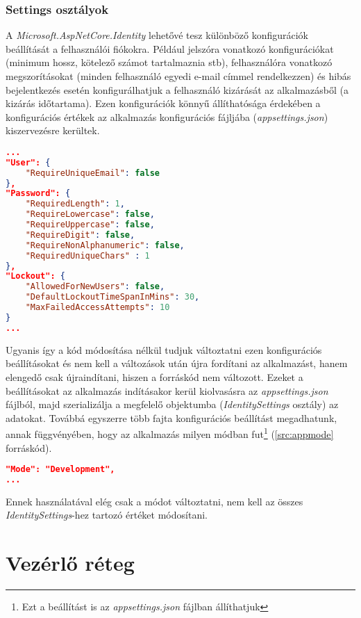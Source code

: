 \subsubsection{Settings osztályok}
A \emph{Microsoft.AspNetCore.Identity} \cite{IdentityOptions} lehetővé tesz különböző konfigurációk beállítását a felhasználói fiókokra. Például jelszóra vonatkozó konfigurációkat (minimum hossz, kötelező számot tartalmaznia stb), felhasználóra vonatkozó megszorításokat (minden felhasználó egyedi e-mail címmel rendelkezzen) és hibás bejelentkezés esetén konfigurálhatjuk a felhasználó kizárását az alkalmazásből (a kizárás időtartama). Ezen konfigurációk könnyű állíthatósága érdekében a konfigurációs értékek az alkalmazás konfigurációs fájljába (\emph{appsettings.json}) kiszervezésre kerültek.
\begin{lstlisting}[language=json]
...
"User": {
	"RequireUniqueEmail": false
},
"Password": {
	"RequiredLength": 1,
	"RequireLowercase": false,
	"RequireUppercase": false,
	"RequireDigit": false,
	"RequireNonAlphanumeric": false,
	"RequiredUniqueChars" : 1
},
"Lockout": {
	"AllowedForNewUsers": false,
	"DefaultLockoutTimeSpanInMins": 30,
	"MaxFailedAccessAttempts": 10
}
...
\end{lstlisting}
Ugyanis így a kód módosítása nélkül tudjuk változtatni ezen konfigurációs beállításokat és nem kell a változások után újra fordítani az alkalmazást, hanem elengedő csak újraindítani, hiszen a forráskód nem változott. Ezeket a beállításokat az alkalmazás indításakor kerül kiolvasásra az \emph{appsettings.json} fájlból, majd szerializálja a megfelelő objektumba (\emph{IdentitySettings} osztály) az adatokat. Továbbá egyszerre több fajta konfigurációs beállítást megadhatunk, annak függvényében, hogy az alkalmazás milyen módban fut\footnote{Ezt a beállítást is az \emph{appsettings.json} fájlban állíthatjuk} (\ref{src:appmode} forráskód).
\begin{lstlisting}[language=json]
"Mode": "Development",
...
\end{lstlisting}
Ennek használatával elég csak a módot változtatni, nem kell az összes \emph{IdentitySettings}-hez tartozó értéket módosítani.
\section{Vezérlő réteg}
\label{sec:controller}

